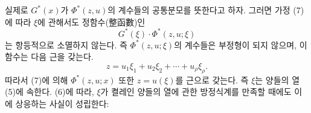 
실제로 $G^*(x)$가 $\Phi^*(z,u)$의 계수들의 공통분모를 뜻한다고 하자. 그러면 가정 (7)에 따라 $\xi$에 관해서도 정함수(整函數)인
\[
G^*(\xi)\cdot\Phi^*(z,u;\xi)
\]
는 항등적으로 소멸하지 않는다. 즉 $\Phi^*(z,u;\xi)$의 계수들은 부정형이 되지 않으며, 이 함수는 다음 근을 갖는다.
\[
z=u_1\xi_1+u_2\xi_2+\cdots+u_\rho\xi_\rho.
\]
따라서 (7)에 의해 $\Phi^*(z,u;x)$ 또한 $z=u(\xi)$를 근으로 갖는다. 즉 $\xi$는 양들의 열 (5)에 속한다. (6)에 따라, $\xi$가 켤레인 양들의 열에 관한 방정식계를 만족할 때에도 이에 상응하는 사실이 성립한다:
